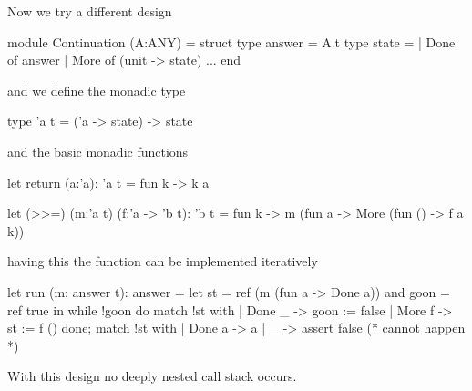 Now we try a different design
%
\begin{ocaml}
  module Continuation (A:ANY) =
  struct
    type answer = A.t
    type state =
      | Done of answer
      | More of (unit -> state)
    ...
  end
\end{ocaml}
%
and we define the monadic type
\begin{ocaml}
  type 'a t = ('a -> state) -> state
\end{ocaml}
%
and the basic monadic functions
\begin{ocaml}
  let return (a:'a): 'a t =
    fun k -> k a

  let (>>=) (m:'a t) (f:'a -> 'b t): 'b t =
    fun k -> m (fun a -> More (fun () -> f a k))
\end{ocaml}
%
having this the function  can be implemented iteratively
\begin{ocaml}
  let run (m: answer t): answer =
    let st = ref (m (fun a -> Done a))
    and goon = ref true
    in
    while !goon do
      match !st with
      | Done _ ->
         goon := false
      | More f ->
         st := f ()
    done;
    match !st with
    | Done a ->
       a
    | _ ->
       assert false (* cannot happen *)
\end{ocaml}
%
With this design no deeply nested call stack occurs.


